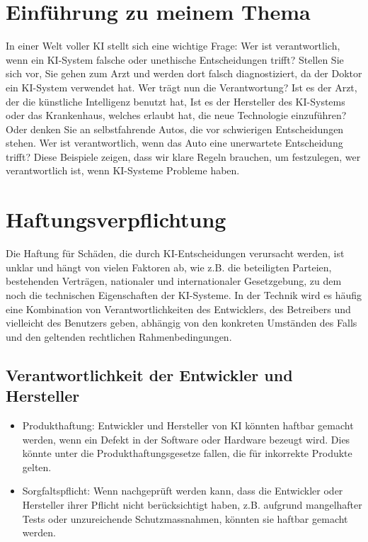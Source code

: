 \documentclass{report}
\begin{document}
\section {Einführung zu meinem Thema}
In einer Welt voller KI stellt sich eine wichtige Frage: Wer ist verantwortlich, 
wenn ein KI-System falsche oder unethische Entscheidungen trifft? 
Stellen Sie sich vor, Sie gehen zum Arzt und werden dort falsch diagnostiziert, da der Doktor ein KI-System verwendet hat. Wer trägt nun die Verantwortung? Ist es der Arzt, der die künstliche Intelligenz benutzt hat, Ist es der Hersteller des KI-Systems oder das Krankenhaus, welches erlaubt hat, die neue Technologie einzuführen?
Oder denken Sie an selbstfahrende Autos, die vor schwierigen Entscheidungen stehen. Wer ist verantwortlich, wenn das Auto eine unerwartete Entscheidung trifft? Diese Beispiele zeigen, dass wir klare Regeln brauchen, um festzulegen, wer verantwortlich ist, wenn KI-Systeme Probleme haben. 

\section{Haftungsverpflichtung}
Die Haftung für Schäden, die durch KI-Entscheidungen verursacht werden, ist unklar und hängt von vielen Faktoren ab, wie z.B. die beteiligten Parteien, bestehenden Verträgen, nationaler und internationaler Gesetzgebung, zu dem noch die technischen Eigenschaften der KI-Systeme. In der Technik wird es häufig eine Kombination von Verantwortlichkeiten des Entwicklers, des Betreibers und vielleicht des Benutzers geben, abhängig von den konkreten Umständen des Falls und den geltenden rechtlichen Rahmenbedingungen.

\subsection{Verantwortlichkeit der Entwickler und Hersteller}

\begin{itemize}
    \item Produkthaftung: Entwickler und Hersteller von KI könnten haftbar gemacht werden, wenn ein Defekt in der Software oder Hardware bezeugt wird. Dies könnte unter die Produkthaftungsgesetze fallen, die für inkorrekte Produkte gelten.
    \item Sorgfaltspflicht: Wenn nachgeprüft werden kann, dass die Entwickler oder Hersteller ihrer Pflicht nicht berücksichtigt haben, z.B. aufgrund mangelhafter Tests oder unzureichende Schutzmassnahmen, könnten sie haftbar gemacht werden.
\end{itemize}
		
\end{document}

